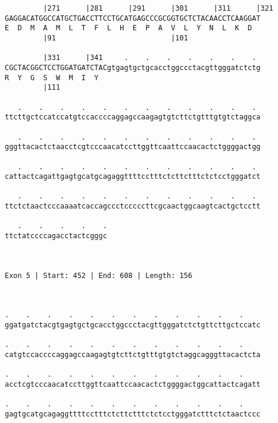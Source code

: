 \documentclass{article}
\begin{document}
\begin{Verbatim}
         |271      |281      |291      |301      |311      |321
GAGGACATGGCCATGCTGACCTTCCTGCATGAGCCCGCGGTGCTCTACAACCTCAAGGAT
E  D  M  A  M  L  T  F  L  H  E  P  A  V  L  Y  N  L  K  D  
         |91                           |101                 
  
         |331      |341     .    .    .    .    .    .    . 
CGCTACGGCTCCTGGATGATCTACgtgagtgctgcacctggccctacgttgggatctctg
R  Y  G  S  W  M  I  Y                                      
         |111                                               
  
   .    .    .    .    .    .    .    .    .    .    .    . 
ttcttgctccatccatgtccaccccaggagccaagagtgtcttctgtttgtgtctaggca
                                                            
   .    .    .    .    .    .    .    .    .    .    .    . 
gggttacactctaacctcgtcccaacatccttggttcaattccaacactctggggactgg
                                                            
   .    .    .    .    .    .    .    .    .    .    .    . 
cattactcagattgagtgcatgcagaggttttcctttctcttctttctctcctgggatct
                                                            
   .    .    .    .    .    .    .    .    .    .    .    . 
ttctctaactcccaaaatcaccagccctcccccttcgcaactggcaagtcactgctcctt
                                                            
   .    .    .    .    .
ttctatccccagacctactcgggc
                        
                        
 
Exon 5 | Start: 452 | End: 608 | Length: 156



.    .    .    .    .    .    .    .    .    .    .    .    
ggatgatctacgtgagtgctgcacctggccctacgttgggatctctgttcttgctccatc
                                                            
.    .    .    .    .    .    .    .    .    .    .    .    
catgtccaccccaggagccaagagtgtcttctgtttgtgtctaggcagggttacactcta
                                                            
.    .    .    .    .    .    .    .    .    .    .    .    
acctcgtcccaacatccttggttcaattccaacactctggggactggcattactcagatt
                                                            
.    .    .    .    .    .    .    .    .    .    .    .    
gagtgcatgcagaggttttcctttctcttctttctctcctgggatctttctctaactccc
                                                            

\end{Verbatim}
\end{document}
